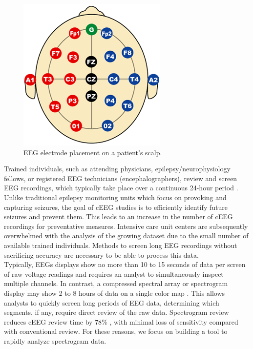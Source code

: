 \begin{figure}[h]
\begin{center}
\includegraphics[scale=0.5]{./img/electrodes.png}
\caption{EEG electrode placement on a patient's scalp.}
\label{fig:electrodes}
\end{center}
\end{figure}

Trained individuals, such as attending physicians, epilepsy/neurophysiology
fellows, or registered EEG technicians (encephalographers), review and screen
EEG recordings, which typically take place over a continuous 24-hour period
\cite{ceeg-3}. Unlike traditional epilepsy monitoring units which focus on
provoking and capturing seizures, the goal of cEEG studies is to efficiently
identify future seizures and prevent them. This leads to an increase in the
number of cEEG recordings for preventative measures. Intensive care unit
centers are subsequently overwhelmed with the analysis of the growing dataset
due to the small number of available trained individuals. Methods to screen
long EEG recordings without sacrificing accuracy are necessary to be able to
process this data. \\

Typically, EEGs displays show no more than 10 to 15 seconds of data per screen
of raw voltage readings and requires an analyst to simultaneously inspect
multiple channels. In contrast, a compressed spectral array \cite{csa} or
spectrogram display may show 2 to 8 hours of data on a single color map
\cite{ceeg-3}. This allows analysts to quickly screen long periods of EEG data,
determining which segments, if any, require direct review of the raw data.
Spectrogram review reduces cEEG review time by $78\%$ \cite{ceeg-2}, with
minimal loss of sensitivity compared with conventional review. For these
reasons, we focus on building a tool to rapidly analyze spectrogram data. \\

